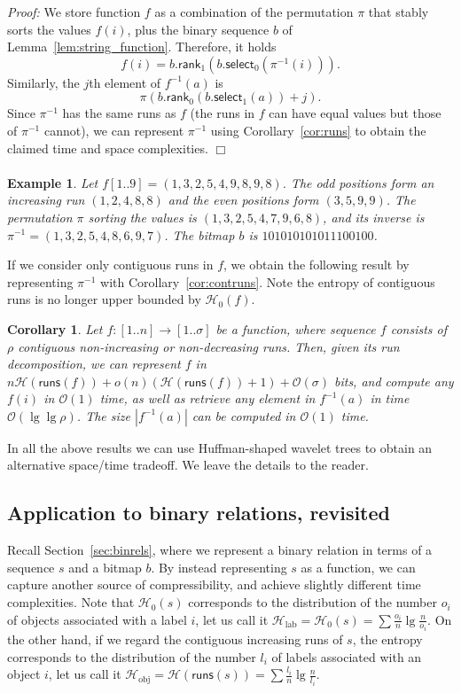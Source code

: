 \documentclass[11pt]{article}
\newtheorem{corollary}[theorem]{Corollary}
\newenvironment{proof}{\textit{Proof:}}{\hfill$\Box$ \paragraph{} }
\newtheorem{example}{Example}
\providecommand{\pii}{\ensuremath{\pi^{-1}}}
\newcommand{\Oh}[1]
    {\ensuremath{\mathcal{O}\left( {#1} \right)}}
\newcommand{\rank}
    {\ensuremath{\mathsf{rank}}}
\newcommand{\select}
    {\ensuremath{\mathsf{select}}}
\newcommand{\runs}
    {\ensuremath{\mathsf{runs}}}
\newcommand{\HH}{\mathcal{H}}
\newcommand{\Ho}{\HH_0}
\begin{document}
\begin{proof}
We store function $f$ as a combination of the permutation $\pi$ that
stably sorts the values $f(i)$, plus the binary sequence $b$ of
Lemma~\ref{lem:string_function}.
Therefore, it holds
\[f (i) = b.\rank_1 (b.\select_0 (\pii(i))).\] 
Similarly, the $j$th element of $f^{-1}(a)$ is 
\[ \pi(b.\rank_0(b.\select_1(a))+j). \]
Since $\pii$ has the same runs as $f$ (the runs in $f$ can have equal
values but those of $\pii$ cannot), we can represent $\pii$ using
Corollary~\ref{cor:runs} to obtain the claimed time and space complexities.
\end{proof}

\begin{example}
Let $f[1..9] = (1,3,2,5,4,9,8,9,8)$. The odd positions form an increasing
run $(1,2,4,8,8)$ and the even positions form $(3,5,9,9)$. The permutation
$\pi$ sorting the values is $(1,3,2,5,4,7,9,6,8)$, and its inverse is
$\pii=(1,3,2,5,4,8,6,9,7)$. The bitmap $b$ is $101010101011100100$.
\end{example}

If we consider only contiguous runs in $f$, we obtain the following result by 
representing $\pii$ with Corollary~\ref{cor:contruns}.
Note the entropy of contiguous runs is no longer upper bounded by $\Ho(f)$.

\begin{corollary} \label{cor:contiguous_function}
Let \(f: [1..n] \rightarrow [1..\sigma]\) be a function, where 
sequence $f$ consists of $\rho$ contiguous non-increasing or
non-decreasing runs. Then, given its run decomposition, we can represent $f$ 
in \(n \HH (\runs (f)) + o(n)(\HH (\runs (f)) + 1) +\Oh{\sigma}\) bits, and 
compute any $f(i)$ in $\Oh{1}$ time, as well as 
retrieve any element in $f^{-1}(a)$ in time $\Oh{\lg\lg\rho}$. 
The size $|f^{-1}(a)|$ can be computed in $\Oh{1}$ time.
\end{corollary}

In all the above results we can use Huffman-shaped wavelet trees 
\cite{BN11} to obtain an alternative space/time tradeoff. We leave the
details to the reader.

\subsection{Application to binary relations, revisited} 

Recall Section~\ref{sec:binrels}, where we represent a binary relation in
terms of a sequence $s$ and a bitmap $b$.
By instead representing $s$ as a function, we can capture another source of
compressibility, and achieve slightly different time complexities.
Note that $\Ho(s)$ corresponds to the distribution of the number $o_i$
of objects associated with a label $i$, let us call it
 $\HH_\mathrm{lab} = \Ho(s) = \sum \frac{o_i}{n}\lg\frac{n}{o_i}$.
On the other hand, if we regard the contiguous increasing runs of $s$, the 
entropy corresponds to the distribution of the number $l_i$ of labels 
associated with an object $i$, let us call it
$\HH_\mathrm{obj} = \HH(\runs(s)) = \sum \frac{l_i}{n}\lg\frac{n}{l_i}$.
\end{document}
